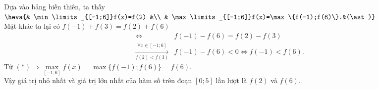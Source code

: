 \begin{ex}
{\begin{center}
        \end{center}
        Dựa vào bảng biến thiên, ta thấy $ \heva{& \min\limits_{[-1;6]}f(x)=f(2) &\\ & \max\limits_{[-1;6]}f(x)=\max\{f(-1);f(6)\}.&(\ast)} $\\
        Mặt khác ta lại có $f(-1)+f(3)=f(2)+f(6) $
        \begin{eqnarray*}
            &\Leftrightarrow&f(-1)-f(6)=f(2)-f(3) \\
            &\xrightarrow[f(2)<f(3)]{\forall x \in [-1;6]}&f(-1)-f(6)<0 \Leftrightarrow f(-1)<f(6).
        \end{eqnarray*}
        Từ $ (\ast) \Rightarrow \max\limits_{[-1;6]}f(x)=\max\{f(-1);f(6)\}=f(6)$.\\
        Vậy giá trị nhỏ nhất và giá trị lớn nhất của hàm số trên đoạn $ [0;5] $ lần lượt là $f(2)$ và $ f(6) $.
    }
\end{ex}
